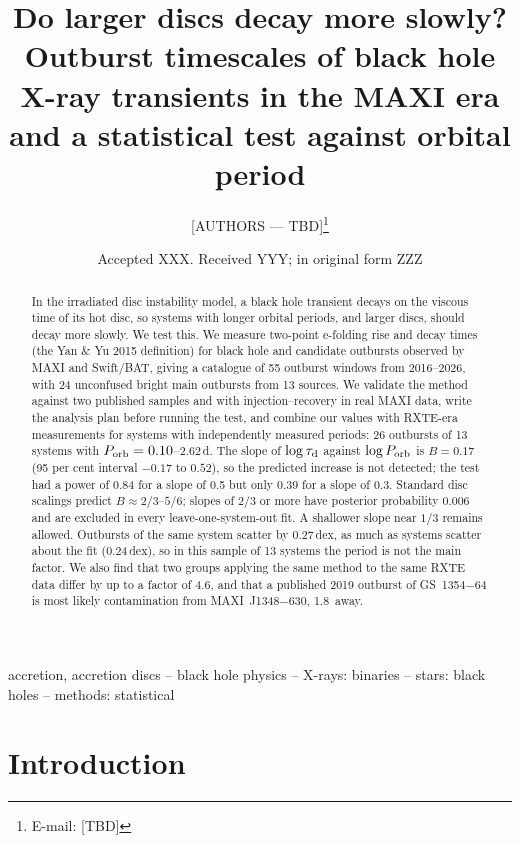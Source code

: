 \documentclass[fleqn,usenatbib]{mnras}
\title[BH transient decay times vs orbital period]{Do larger discs decay more slowly? Outburst timescales of black hole X-ray transients in the MAXI era and a statistical test against orbital period}
\author[{[AUTHORS --- TBD]}]{[AUTHORS --- TBD]\thanks{E-mail: [TBD]}
\\
[Affiliations --- TBD]}
\date{Accepted XXX. Received YYY; in original form ZZZ}
\newcommand{\taud}{\tau_{\rm d}}
\newcommand{\porb}{P_{\rm orb}}
\newcommand{\dex}{\,dex}
\begin{document}
\label{firstpage}
\pagerange{\pageref{firstpage}--\pageref{lastpage}}
\maketitle

\begin{abstract}
In the irradiated disc instability model, a black hole transient decays on the viscous time of its hot disc, so systems with longer orbital periods, and larger discs, should decay more slowly. We test this. We measure two-point e-folding rise and decay times (the Yan \& Yu 2015 definition) for black hole and candidate outbursts observed by MAXI and Swift/BAT, giving a catalogue of 55 outburst windows from 2016--2026, with 24 unconfused bright main outbursts from 13 sources. We validate the method against two published samples and with injection--recovery in real MAXI data, write the analysis plan before running the test, and combine our values with RXTE-era measurements for systems with independently measured periods: 26 outbursts of 13 systems with $\porb=0.10$--$2.62$\,d. The slope of $\log\taud$ against $\log\porb$ is $B=0.17$ (95 per cent interval $-0.17$ to $0.52$), so the predicted increase is not detected; the test had a power of 0.84 for a slope of 0.5 but only 0.39 for a slope of 0.3. Standard disc scalings predict $B\approx2/3$--$5/6$; slopes of $2/3$ or more have posterior probability 0.006 and are excluded in every leave-one-system-out fit. A shallower slope near $1/3$ remains allowed. Outbursts of the same system scatter by 0.27\dex, as much as systems scatter about the fit (0.24\dex), so in this sample of 13 systems the period is not the main factor. We also find that two groups applying the same method to the same RXTE data differ by up to a factor of 4.6, and that a published 2019 outburst of GS~1354$-$64 is most likely contamination from MAXI~J1348$-$630, 1.8\degr\ away.
\end{abstract}

\begin{keywords}
accretion, accretion discs -- black hole physics -- X-rays: binaries -- stars: black holes -- methods: statistical
\end{keywords}

\section{Introduction}
\label{sec:intro}
\end{document}
